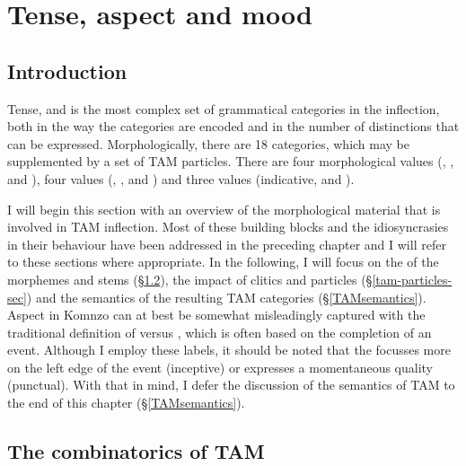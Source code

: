 
\chapter{Tense, aspect and mood} \label{TAMpalooza}

\section{Introduction} \label{TAMintro}

Tense,  and  is the most complex set of grammatical categories in the  inflection, both in the way the categories are encoded and in the number of distinctions that can be expressed. Morphologically, there are 18 categories, which may be supplemented by a set of TAM particles. There are four morphological  values (, ,  and ), four  values (, ,  and ) and three  values (indicative,  and ).

I will begin this section with an overview of the morphological material that is involved in TAM inflection. Most of these building blocks and the idiosyncrasies in their behaviour have been addressed in the preceding chapter and I will refer to these sections where appropriate. In the following, I will focus on the  of the morphemes and stems (\S\ref{combitam}), the impact of clitics and particles (\S\ref{tam-particles-sec}) and the semantics of the resulting TAM categories (\S\ref{TAMsemantics}). Aspect in Komnzo can at best be somewhat misleadingly captured with the traditional definition of  versus , which is often based on the completion of an event. Although I employ these labels, it should be noted that the  focusses more on the left edge of the event (inceptive) or expresses a momentaneous quality (punctual). With that in mind, I defer the discussion of the semantics of TAM to the end of this chapter (\S\ref{TAMsemantics}).

\section{The combinatorics of TAM} \label{combitam}

